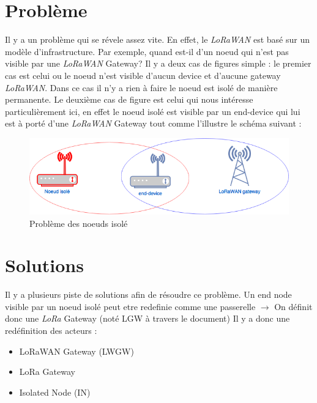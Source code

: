 \documentclass[11pt]{article}
\begin{document}
\newpage
\section{Problème}
Il y a un problème qui se révele assez vite. En effet, le  \textit{LoRaWAN} est basé sur un modèle d'infrastructure. Par exemple, quand est-il d'un noeud qui n'est pas visible par une  \textit{LoRaWAN} Gateway? Il y a deux cas de figures simple : le premier cas est celui  ou le noeud n'est visible d'aucun device et d'aucune gateway  \textit{LoRaWAN}. Dans ce cas il n'y a rien à faire le noeud est isolé de manière permanente. Le deuxième cas de figure est celui qui nous intéresse particulièrement ici, en effet le noeud isolé est visible par un end-device qui lui est à porté d'une  \textit{LoRaWAN} Gateway tout comme l'illustre le schéma suivant :


\begin{figure}[h!]
\centering
\includegraphics[scale=0.6]{probleme.png} 
\caption{Problème des noeuds isolé}
\end{figure}

\newpage
\section{Solutions}
Il y a  plusieurs piste de solutions afin de résoudre ce problème. Un end node visible par un noeud isolé peut etre redefinie comme une passerelle $\rightarrow$ On définit donc une \textit{LoRa} Gateway (noté LGW à travers le document)
Il y a donc une redéfinition des acteurs :
\begin{itemize}
\item LoRaWAN Gateway (LWGW)
\item LoRa Gateway 
\item Isolated Node (IN)
\end{itemize}
\end{document}
